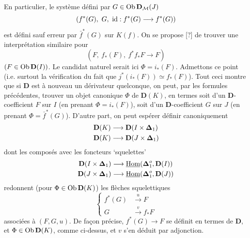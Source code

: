 En particulier, le système défini par $G \in \mathrm{Ob}\, \mathbf{D}_{\mathcal{M}}(J)$
\[ (f^*(G),\ G,\ \mathrm{id} : f^*(G) \longrightarrow f^*(G)) \]
est défini sauf erreur par $\bar{f}^*(G)$ sur $K(f)$. On se propose [?] de trouver une interprétation similaire pour
\[ (F,\ f_*(F),\ f^*f_*F \longrightarrow F) \]
$(F \in \mathrm{Ob}\, \mathbf{D}(I))$. Le candidat naturel serait ici $\Phi = i_*(F)$. Admettons ce point (i.e. surtout la vérification du fait que $j^*(i_*(F)) \simeq f_*(F)$). Tout ceci montre que si $\mathbf{D}$ est à nouveau un dérivateur quelconque, on peut, par les formules précédentes, trouver un objet canonique $\Phi$ de $\mathbf{D}(K)$, en termes soit d'un $\mathbf{D}$-coefficient $F$ sur $I$ (en prenant $\Phi = i_*(F)$), soit d'un $\mathbf{D}$-coefficient $G$ sur $J$ (en prenant $\Phi = \bar{f}^*(G)$). D'autre part, on peut espérer définir canoniquement
\[
\begin{aligned}
\mathbf{D}(K) &\longrightarrow \mathbf{D}(I \times \boldsymbol{\Delta}_1)\\
\mathbf{D}(K) &\longrightarrow \mathbf{D}(J \times \boldsymbol{\Delta}_1)
\end{aligned}
\]
dont les composés avec les foncteurs ‘squelettes’
\[
\begin{aligned}
\mathbf{D}(I \times \boldsymbol{\Delta}_1) &\longrightarrow \underline{\mathrm{Hom}}(\boldsymbol{\Delta}_1^o, \mathbf{D}(I))\\
\mathbf{D}(J \times \boldsymbol{\Delta}_1) &\longrightarrow \underline{\mathrm{Hom}}(\boldsymbol{\Delta}_1^o, \mathbf{D}(J))
\end{aligned}
\]
redonnent (pour $\Phi \in \mathrm{Ob}\, \mathbf{D}(K)$) les flèches squelettiques
\[
\left\{
\begin{aligned}
f^*(G) &\xrightarrow{\ u\ } F\\
G &\xrightarrow{\ v\ } f_*F
\end{aligned}
\right.
\]
associées à $(F,G,u)$. De façon précise, $f^*(G) \longrightarrow F$ se définit en termes de $\mathbf{D}$, et $\Phi \in \mathrm{Ob}\, \mathbf{D}(K)$, comme ci-dessus, et $v$ s'en déduit par adjonction.

